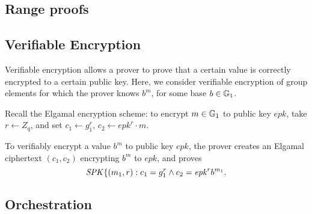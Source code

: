\subsection{Range proofs}


\subsection{Verifiable Encryption}
Verifiable encryption allows a prover to prove that a certain value is correctly encrypted to a certain public key.
Here, we consider verifiable encryption of group elements for which the prover knows $b^m$, for some base $b \in \mathbb{G}_1$.

Recall the Elgamal encryption scheme: 
to encrypt $m \in \mathbb{G}_1$ to public key $\mathit{epk}$, take $r \gets Z_q$, and set $c_1 \gets g_1^r$, $c_2 \gets \mathit{epk}^r \cdot m$.

To verifiably encrypt a value $b^m$ to public key $\mathit{epk}$, the prover creates an Elgamal ciphertext $(c_1, c_2)$ encrypting $b^m$ to $\mathit{epk}$,
and proves
\[\mathit{SPK}\{(m_1, r) : c_1 = g_1^r \land c_2 = \mathit{epk}^r b^{m_1} .\]

\subsection{Orchestration}

